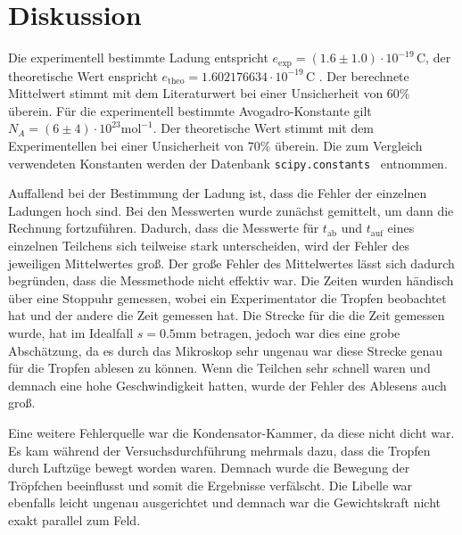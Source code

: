 \newpage
\section{Diskussion}
\label{sec:diskussion}




Die experimentell bestimmte Ladung entspricht $e_{\text{exp}} = (1.6 \pm 1.0) \cdot 10^{-19} \, \mathrm{C}$, der
theoretische Wert enspricht $e_{\text{theo}} = 1.602176634 \cdot 10^{-19} \, \mathrm{C}$ . Der berechnete
Mittelwert stimmt mit dem Literaturwert bei einer Unsicherheit von $60 \%$ überein. 
Für die experimentell bestimmte Avogadro-Konstante gilt $N_{\! A} = (6 \pm 4) \cdot 10^{23} \mathrm{mol}^{-1}$.
Der theoretische Wert stimmt mit dem Experimentellen bei einer Unsicherheit von $70\%$ überein.
Die zum Vergleich verwendeten Konstanten werden der Datenbank \verb+scipy.constants+~\cite{scipy} entnommen.

Auffallend bei der Bestimmung der Ladung ist, dass die Fehler der einzelnen Ladungen hoch sind. Bei den Messwerten wurde
zunächst gemittelt, um dann die Rechnung fortzuführen. Dadurch, dass die Messwerte für $t_{\text{ab}}$ und $t_{\text{auf}}$ eines einzelnen Teilchens
sich teilweise stark unterscheiden, wird der Fehler des jeweiligen Mittelwertes groß. 
Der große Fehler des Mittelwertes lässt sich dadurch begründen, dass die Messmethode nicht effektiv war. Die Zeiten wurden
händisch über eine Stoppuhr gemessen, wobei ein Experimentator die Tropfen beobachtet hat und der andere
die Zeit gemessen hat. Die Strecke für die die Zeit gemessen wurde, hat im Idealfall $s = 0.5 \mathrm{mm}$ betragen, jedoch
war dies eine grobe Abschätzung, da es durch das Mikroskop sehr ungenau war diese Strecke genau für die Tropfen ablesen
zu können. Wenn die Teilchen sehr schnell waren und demnach eine hohe Geschwindigkeit hatten, wurde der Fehler des
Ablesens auch groß. 

Eine weitere Fehlerquelle war die Kondensator-Kammer, da diese nicht dicht war. Es kam während der Versuchsdurchführung mehrmals
dazu, dass die Tropfen durch Luftzüge bewegt worden waren. Demnach wurde die Bewegung der Tröpfchen beeinflusst und somit 
die Ergebnisse verfälscht. Die Libelle war ebenfalls leicht ungenau ausgerichtet und demnach war die Gewichtskraft nicht
exakt parallel zum Feld.

